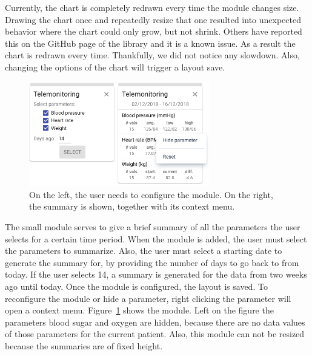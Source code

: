             Currently, the chart is completely redrawn every time the module changes size. Drawing the chart once and repeatedly resize that one resulted into unexpected behavior where the chart could only grow, but not shrink. Others have reported this on the GitHub page of the library and it is a known issue. As a result the chart is redrawn every time. Thankfully, we did not notice any slowdown. Also, changing the options of the chart will trigger a layout save.

            \begin{figure}[t]
                \centering
                \includegraphics[width=0.7\textwidth]{chapters/4_implementation/tm-small}
                \caption{On the left, the user needs to configure the module. On the right, the summary is shown, together with its context menu.}\label{fig:tm-small}
            \end{figure}

            The small module serves to give a brief summary of all the parameters the user selects for a certain time period. When the module is added, the user must select the parameters to summarize. Also, the user must select a starting date to generate the summary for, by providing the number of days to go back to from today. If the user selects 14, a summary is generated for the data from two weeks ago until today. Once  the module is configured, the layout is saved. To reconfigure the module or hide a parameter, right clicking the parameter will open a context menu. Figure~\ref{fig:tm-small} shows the module. Left on the figure the parameters blood sugar and oxygen are hidden, because there are no data values of those parameters for the current patient. Also, this module can not be resized because the summaries are of fixed height.